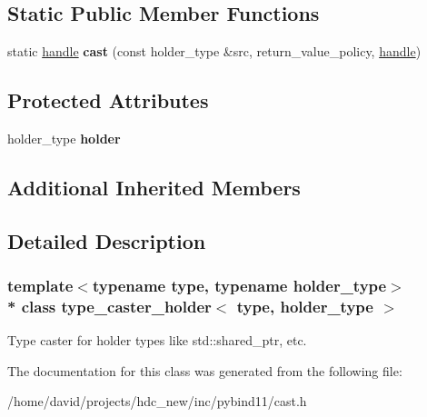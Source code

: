 \subsection*{Static Public Member Functions}
\begin{DoxyCompactItemize}
\item 
static \hyperlink{classhandle}{handle} {\bfseries cast} (const holder\+\_\+type \&src, return\+\_\+value\+\_\+policy, \hyperlink{classhandle}{handle})\hypertarget{classtype__caster__holder_a632a31722a5b7142444494a030f18402}{}\label{classtype__caster__holder_a632a31722a5b7142444494a030f18402}

\end{DoxyCompactItemize}
\subsection*{Protected Attributes}
\begin{DoxyCompactItemize}
\item 
holder\+\_\+type {\bfseries holder}\hypertarget{classtype__caster__holder_ab8cf1dd21a8b7e6ea8d1c31f0cfb7755}{}\label{classtype__caster__holder_ab8cf1dd21a8b7e6ea8d1c31f0cfb7755}

\end{DoxyCompactItemize}
\subsection*{Additional Inherited Members}


\subsection{Detailed Description}
\subsubsection*{template$<$typename type, typename holder\+\_\+type$>$\\*
class type\+\_\+caster\+\_\+holder$<$ type, holder\+\_\+type $>$}

Type caster for holder types like std\+::shared\+\_\+ptr, etc. 

The documentation for this class was generated from the following file\+:\begin{DoxyCompactItemize}
\item 
/home/david/projects/hdc\+\_\+new/inc/pybind11/cast.\+h\end{DoxyCompactItemize}
